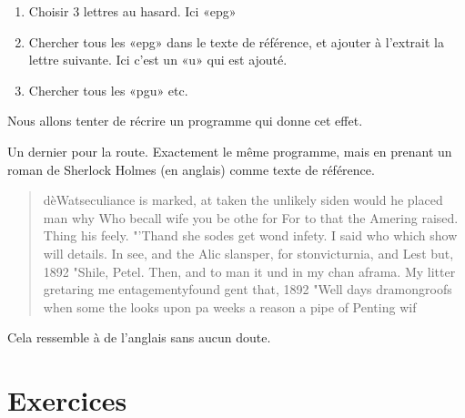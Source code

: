 \begin{enumerate}
    \item
        Choisir 3 lettres au hasard. Ici «epg» 
    \item
        Chercher tous les «epg» dans le texte de référence, et ajouter à l'extrait la lettre suivante. Ici c'est un «u» qui est ajouté.
    \item
        Chercher tous les «pgu» etc.
\end{enumerate}

Nous allons tenter de récrire un programme qui donne cet effet.


Un dernier pour la route. Exactement le même programme, mais en prenant un roman de Sherlock Holmes (en anglais) comme texte de référence.
\begin{quote}
dèWatseculiance is marked, at taken the unlikely siden would he placed man why Who becall wife you be othe for For to that the Amering raised. Thing his feely. "'Thand she sodes get wond infety. I said who which show will details. In see, and the Alic slansper, for stonvicturnia, and Lest but, 1892 "Shile, Petel. Then, and to man it und in my chan aframa. My litter gretaring me entagementyfound gent that, 1892 "Well days dramongroofs when some the looks upon pa weeks a reason a pipe of Penting wif
\end{quote}
Cela ressemble à de l'anglais sans aucun doute.


\section{Exercices}

